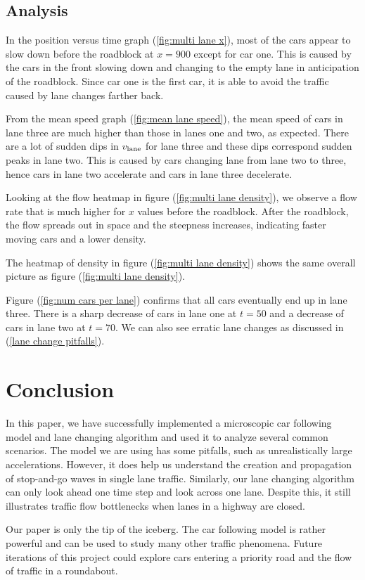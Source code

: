 \documentclass[12pt]{article}
\begin{document}
  \subsection{Analysis}

    In the position versus time graph (\ref{fig:multi lane x}), most of the cars appear to slow down before the roadblock at $x = 900$ except for car one. This is caused by the cars in the front slowing down and changing to the empty lane in anticipation of the roadblock. Since car one is the first car, it is able to avoid the traffic caused by lane changes farther back.
   
    From the mean speed graph (\ref{fig:mean lane speed}), the mean speed of cars in lane three are much higher than those in lanes one and two, as expected. There are a lot of sudden dips in $v_{\rm lane}$ for lane three and these dips correspond sudden peaks in lane two. This is caused by cars changing lane from lane two to three, hence cars in lane two accelerate and cars in lane three decelerate.

   Looking at the flow heatmap in figure (\ref{fig:multi lane density}), we observe a  flow rate that is much higher for $x$ values before the roadblock. After the roadblock, the flow spreads out in space and the steepness increases, indicating faster moving cars and a lower density.

    The heatmap of density in figure (\ref{fig:multi lane density}) shows the same overall picture as figure (\ref{fig:multi lane density}).

    Figure (\ref{fig:num cars per lane}) confirms that all cars eventually end up in lane three. There is a sharp decrease of cars in lane one at $t=50$ and a decrease of cars in lane two at $t = 70$. We can also see erratic lane changes as discussed in (\ref{lane change pitfalls}).

    \section{Conclusion}
    In this paper, we have successfully implemented a microscopic car following model and lane changing algorithm and used it to analyze several common scenarios. The model we are using has some pitfalls, such as unrealistically large accelerations. However, it does help us understand the creation and propagation of stop-and-go waves in single lane traffic. Similarly, our lane changing algorithm can only look ahead one time step and look across one lane. Despite this, it still illustrates traffic flow bottlenecks when lanes in a highway are closed.

    Our paper is only the tip of the iceberg. The car following model is rather powerful and can be used to study many other traffic phenomena. Future iterations of this project could explore cars entering a priority road and the flow of traffic in a roundabout.
    
  \newpage    
    \printunsrtglossary[type=symbols,style=long,title={List of Symbols and Constants}]
    \newpage 
    \printbibliography
\end{document}
